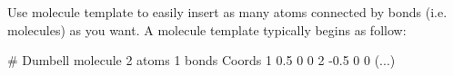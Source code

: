 \begin{tcolorbox}[colback=mylightblue!5!white,colframe=mylightblue!75!black,title=Hints]
Use molecule template to easily insert as many atoms connected
by bonds (i.e. molecules) as you want. A molecule 
template typically begins as follow:
\begin{lcverbatim}
# Dumbell molecule
2 atoms
1 bonds
Coords
1 0.5 0 0
2 -0.5 0 0
(...)
\end{lcverbatim}

\noindent \end{tcolorbox}

